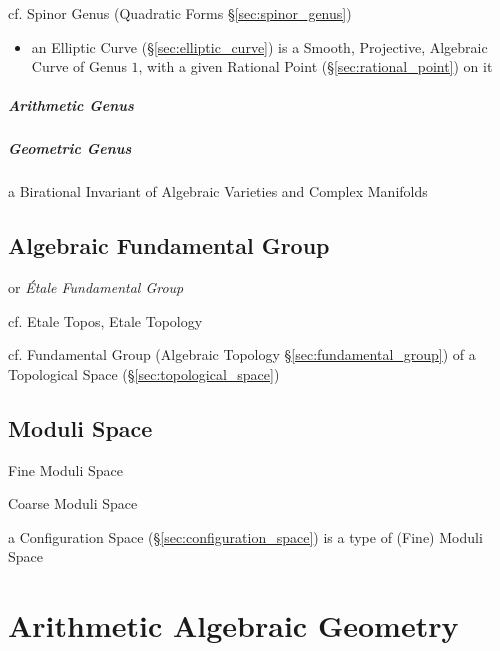 \begin{itemize}
\begin{itemize}
\fist cf. Spinor Genus (Quadratic Forms \S\ref{sec:spinor_genus})

\begin{itemize}
  \item an Elliptic Curve (\S\ref{sec:elliptic_curve}) is a Smooth, Projective,
    Algebraic Curve of Genus $1$, with a given Rational Point
    (\S\ref{sec:rational_point}) on it
\end{itemize}



\subparagraph{Arithmetic Genus}\label{sec:arithmetic_genus}\hfill

\subparagraph{Geometric Genus}\label{sec:geometric_genus}\hfill

a Birational Invariant of Algebraic Varieties and Complex Manifolds



\subsection{Algebraic Fundamental Group}\label{sec:algebraic_fundamental_group}

or \emph{\'Etale Fundamental Group}

cf. Etale Topos, Etale Topology

cf. Fundamental Group (Algebraic Topology \S\ref{sec:fundamental_group}) of a
Topological Space (\S\ref{sec:topological_space})



\subsection{Moduli Space}\label{sec:moduli_space}

Fine Moduli Space

Coarse Moduli Space

a Configuration Space (\S\ref{sec:configuration_space}) is a type of (Fine)
Moduli Space



\section{Arithmetic Algebraic Geometry}\label{sec:arithmetic_algebraic_geometry}


\end{itemize}
\end{itemize}
